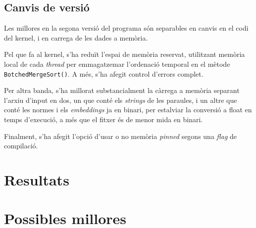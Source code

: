 \documentclass[catalan,10pt,a4paper]{article}
\begin{document}
	\subsection*{Canvis de versió}
	Les millores en la segona versió del programa són separables en canvis en el codi del kernel, i en carrega de les dades a memòria.
	
	Pel que fa al kernel, s'ha reduït l'espai de memòria reservat, utilitzant memòria local de cada \textit{thread} per emmagatzemar l'ordenació temporal en el mètode \verb|BotchedMergeSort()|. A més, s'ha afegit control d'errors complet.
	
	Per altra banda, s'ha millorat substancialment la càrrega a memòria separant l'arxiu d'input en dos, un que conté els \textit{strings} de les paraules, i un altre que conté les normes i els \textit{embeddings} ja en binari, per estalviar la conversió a float en temps d'execució, a més que el fitxer és de menor mida en binari.
	
	Finalment, s'ha afegit l'opció d'usar o no memòria \textit{pinned} segons una \textit{flag} de compilació.
	
	\section*{Resultats}
	
	\section*{Possibles millores}
\end{document}
